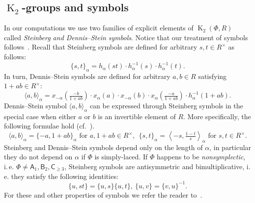 \documentclass[oneside, 8pt]{amsart}
\theoremstyle{remark}
\theoremstyle{definition}
\numberwithin{lemma}{section}
\numberwithin{prop}{section}
\numberwithin{corollary}{section}
\DeclareMathOperator{\K}{K}
\newcommand{\rA}{\mathsf{A}}
\newcommand{\rB}{\mathsf{B}}
\newcommand{\rC}{\mathsf{C}}
\numberwithin{equation}{section}
\begin{document}
\subsection{\texorpdfstring{$\K_2$}{K2}-groups and symbols} In our computations we use two families of explicit elements of $\K_2(\Phi, R)$ called {\it Steinberg and Dennis--Stein symbols}. Notice that our treatment of symbols follows~\cite{DS73}. Recall that Steinberg symbols are defined for arbitrary $s, t \in R^\times$ as follows:
\begin{equation} \label{eq:steinberg} \{ s, t \}_\alpha = h_\alpha(st) \cdot h_\alpha^{-1}(s) \cdot h_\alpha^{-1}(t). \end{equation}
In turn, Dennis--Stein symbols are defined for arbitrary $a, b\in R$ satisfying $1 + ab \in R^\times$:
\begin{equation} \label{eq:dennis-stein}  \langle a,b \rangle _ \alpha = x_{-\alpha}\left(\tfrac{- b}{1 + ab}\right) \cdot x_{\alpha}(a) \cdot x_{-\alpha}(b) \cdot x_{\alpha}\left(\tfrac{- a}{1+ab}\right) \cdot h_{\alpha}^{-1}(1 + ab). \end{equation} 
Dennis--Stein symbol $\langle a, b \rangle_\alpha$ can be expressed through Steinberg symbols in the special case when either $a$ or $b$ is an invertible element of $R$. More specifically, the following formulae hold (cf.~\cite[p.~250]{DS73}).
\begin{equation} \label{DS-S-relationship} \langle a, b \rangle_\alpha = \{-a, 1+ab\}_\alpha\text{ for } a, 1+ab\in R^\times,\ \
 \{ s, t \}_\alpha = \left\langle -s, \tfrac{1 - t}{s} \right\rangle_\alpha\text{ for } s, t\in R^\times. \end{equation}
Steinberg and Dennis--Stein symbols depend only on the length of $\alpha$, in particular they do not depend on $\alpha$ if $\Phi$ is simply-laced. If $\Phi$ happens to be {\it nonsymplectic}, i.\,e. $\Phi \neq \rA_1, \rB_2, \rC_{\geq 3}$, Steinberg symbols are antisymmetric and bimultiplicative, i.\,e. they satisfy the following identities: \begin{equation} \label{eq:symbol-properties} \{ u, st \} = \{ u, s\} \{ u, t \}, \ \{ u, v \} = \{ v, u\}^{-1}. \end{equation}
For these and other properties of symbols we refer the reader to~\cite{DS73}.
\end{document}
